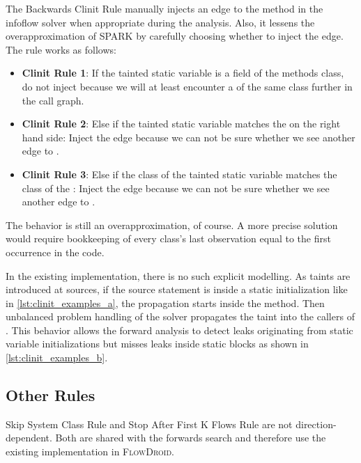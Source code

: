 \documentclass[../draft.tex]{subfiles}
\begin{document}
    The Backwards Clinit Rule manually injects an edge to the  method in the infoflow solver when appropriate during the analysis. 
    Also, it lessens the overapproximation of SPARK by carefully choosing whether to inject the edge. The rule works as follows:
    \begin{itemize}
        \item \textbf{Clinit Rule 1}: If the tainted static variable is a field of the methods class, do not inject because we will at least encounter a  of the same class further in the call graph.
        \item \textbf{Clinit Rule 2}: Else if the tainted static variable matches the  on the right hand side: Inject the edge because we can not be sure whether we see another edge to .
        \item \textbf{Clinit Rule 3}: Else if the class of the tainted static variable matches the class of the : Inject the edge because we can not be sure whether we see another edge to .
    \end{itemize}
    The behavior is still an overapproximation, of course. 
    A more precise solution would require bookkeeping of every class's last observation equal to the first occurrence in the code. 

    In the existing implementation, there is no such explicit modelling. 
    As taints are introduced at sources, if the source statement is inside a static initialization like in \autoref{lst:clinit_examples_a}, the propagation starts inside the  method. 
    Then unbalanced problem handling of the solver propagates the taint into the callers of . 
    This behavior allows the forward analysis to detect leaks originating from static variable initializations but misses leaks inside static blocks as shown in \autoref{lst:clinit_examples_b}.

    \subsection{Other Rules}
    Skip System Class Rule and Stop After First K Flows Rule are not direction-dependent. 
    Both are shared with the forwards search and therefore use the existing implementation in \textsc{FlowDroid}.
    
\end{document}
